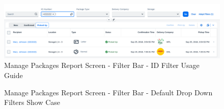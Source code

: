 \begin{figure}[H]
	\centering
	\includegraphics[width=1\linewidth]{images/user_doc/managePack/ReportScreen/browse/defaultFreeTextIdUsage.png}
	\caption{Manage Packages Report Screen - Filter Bar - ID Filter Usage Guide}
	\label{fig:MPIDFIlter}
\end{figure}

\begin{figure}[H]
	\centering
	\hspace{5pt}

	\caption{Manage Packages Report Screen - Filter Bar - Default Drop Down Filters Show Case}
	\label{fig:MPDefaultDropDown}
\end{figure}

